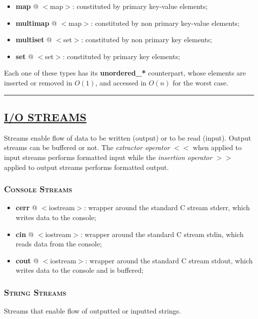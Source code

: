 \documentclass[10pt]{article}
\begin{document}
\begin{multicols*}{5}
{\begin{itemize}[leftmargin=*,topsep=0.25pt]
  \setlength\itemsep{-1.8pt}
	\item \textbf{map} @ $<$map$>$: constituted by primary key-value elements;
	\item \textbf{multimap} @ $<$map$>$: constituted by non primary key-value elements;  
	\item \textbf{multiset} @ $<$set$>$: constituted by non primary key elements;
	\item \textbf{set} @ $<$set$>$: constituted by primary key elements;
\end{itemize}
\noindent
Each one of these types has its \textbf{unordered\_*} counterpart, whose elements are inserted or removed in $O(1)$, and accessed in $O(n)$ for the worst case. 


}

\par\noindent\rule{155pt}{0.4pt}

{\color{Blue}
\subsection*{\href{https://en.cppreference.com/w/cpp/io}{\underline{I/O STREAMS}}}	
\noindent
Streams enable flow of data to be written (output) or to be read (input). Output streams can be buffered or not.
The \emph{extractor operator} $<<$ when applied to input streams performs formatted input while the \emph{insertion operator} $>>$ applied to output streams performs formatted output. 

\subsubsection*{\textsc{Console Streams}} 
\begin{itemize}[leftmargin=*,topsep=0.25pt]
  \setlength\itemsep{-1.8pt}
	\item \textbf{cerr} @ $<$iostream$>$: wrapper around the standard C stream stderr, which writes data to the console;
	\item \textbf{cin} @ $<$iostream$>$: wrapper around the standard C stream stdin, which reads data from the console;
	\item \textbf{cout} @ $<$iostream$>$: wrapper around the standard C stream stdout, which writes data to the console and is buffered;
\end{itemize}

\subsubsection*{\textsc{String Streams}}
\noindent
Streams that enable flow of outputted or inputted strings.

}
\end{multicols*}
\end{document}

